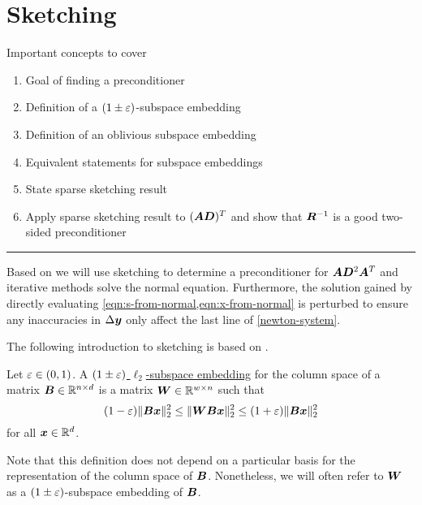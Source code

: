 \chapter{Sketching}

Important concepts to cover
\begin{enumerate}
  \item Goal of finding a preconditioner
  \item Definition of a \((1\pm\varepsilon)\)-subspace embedding
  \item Definition of an oblivious subspace embedding
  \item Equivalent statements for subspace embeddings
  \item State sparse sketching result
  \item Apply sparse sketching result to \((\bm{A}\bm{D})^T\) and show that \(\bm{R}^{-1}\) is a good two-sided preconditioner
\end{enumerate}

\hrule

Based on \cite{Avron-FasterRandomizedInfeasibleIPMs} we will use sketching to determine a preconditioner for \(\bm{A} \bm{D}^2 \bm{A}^T\) and iterative methods solve the normal equation. Furthermore, the solution gained by directly evaluating \cref{eqn:s-from-normal,eqn:x-from-normal} is perturbed to ensure any inaccuracies in \(\Delta\bm{y}\) only affect the last line of \cref{newton-system}.

The following introduction to sketching is based on \cite{Woodruff-Sketching}.

\begin{definition} \label{def:subspace-embedding}
Let \(\varepsilon \in (0, 1)\). A \uline{\((1 \pm \varepsilon)\) \(\ell_2\)-subspace embedding} for the column space of a matrix \(\bm{B} \in \mathbb{R}^{n \times d}\) is a matrix \(\bm{W} \in \mathbb{R}^{w \times n}\) such that
\[ (1-\varepsilon) \lVert \bm{B}\bm{x} \rVert_2^2 \leq \lVert \bm{W}\bm{B}\bm{x} \rVert_2^2 \leq (1+\varepsilon)\lVert \bm{B}\bm{x} \rVert_2^2 \]
for all \(\bm{x} \in \mathbb{R}^d\).
\end{definition}
Note that this definition does not depend on a particular basis for the representation of the column space of \(\bm{B}\).
Nonetheless, we will often refer to \(\bm{W}\) as a \((1\pm\varepsilon)\)-subspace embedding of \(\bm{B}\).

